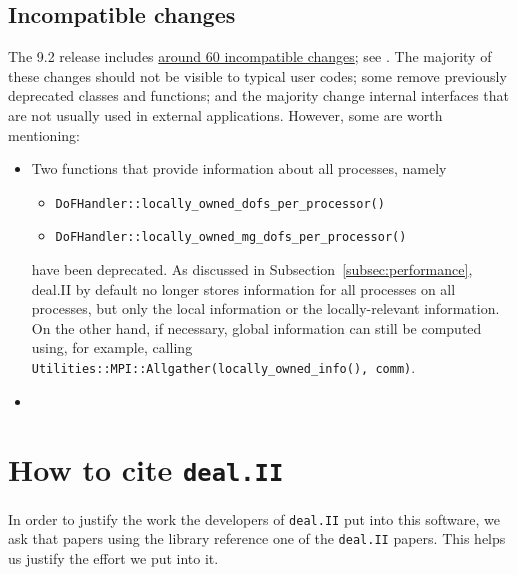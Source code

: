 \documentclass{ansarticle-preprint}
\newcommand{\specialword}[1]{\texttt{#1}}
\newcommand{\dealii}{{\specialword{deal.II}}\xspace}
\begin{document}
\subsection{Incompatible changes}

The 9.2 release includes
\href{https://dealii.org/developer/doxygen/deal.II/changes_between_9_1_1_and_9_2_0.html}
     {around 60 incompatible changes}; see \cite{changes92}. The majority of these changes
should not be visible to typical user codes; some remove previously
deprecated classes and functions; and the majority change internal
interfaces that are not usually used in external
applications. However, some are worth mentioning:
\begin{itemize}
\item Two functions that provide information about all processes,
  namely
  \begin{itemize}
 \item \texttt{DoFHandler::locally\_owned\_dofs\_per\_processor()}
 \item \texttt{DoFHandler::locally\_owned\_mg\_dofs\_per\_processor()}
  \end{itemize}
have been deprecated. As discussed in
Subsection~\ref{subsec:performance}, deal.II by default no longer
stores information for all processes on all processes, but only the
local information or the locally-relevant information. On the other
hand, if necessary, global information can still be computed using,
for example, calling \texttt{Utilities::MPI::Allgather(locally\_owned\_info(), comm)}.
\item
\end{itemize}



\section{How to cite \dealii}\label{sec:cite}

In order to justify the work the developers of \dealii put into this
software, we ask that papers using the library reference one of the
\dealii papers. This helps us justify the effort we put into it.
\end{document}
